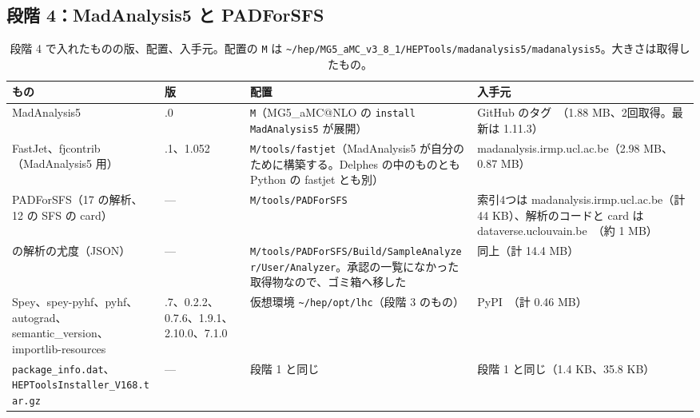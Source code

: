 \documentclass[a4paper,10pt]{ltjsarticle}
\makeatletter
\newcommand{\MGaMC}{MG5\_aMC@NLO}
\newcommand{\pth}[1]{\texttt{\textasciitilde/}\nolinkurl{#1}}
\makeatother
\begin{document}
\subsection{段階 4：MadAnalysis5 と PADForSFS}\label{sec:lhc4}

\begin{table}[htbp]
\centering\small
\caption{段階 4 で入れたものの版、配置、入手元。配置の \texttt{M} は \pth{hep/MG5_aMC_v3_8_1/HEPTools/madanalysis5/madanalysis5}。大きさは取得したもの。}
\label{tab:lhc4}
\begin{tabularx}{\linewidth}{>{\raggedright\arraybackslash}p{3.4cm}>{\raggedright\arraybackslash}p{1.7cm}>{\raggedright\arraybackslash}X>{\raggedright\arraybackslash}p{4.0cm}}
\toprule
\textbf{もの} & \textbf{版} & \textbf{配置} & \textbf{入手元} \\
\midrule
MadAnalysis5 & 1.11.0 & \texttt{M}（\MGaMC{} の \texttt{install MadAnalysis5} が展開） & GitHub のタグ~\cite{ma5,ma5expert,url:ma5}（1.88 MB、2回取得。最新は 1.11.3） \\
FastJet、fjcontrib（MadAnalysis5 用） & 3.4.1、1.052 & \texttt{M/tools/fastjet}（MadAnalysis5 が自分のために構築する。Delphes の中のものとも Python の fastjet とも別） & madanalysis.irmp.ucl.ac.be（2.98 MB、0.87 MB） \\
PADForSFS（17 の解析、12 の SFS の card） & — & \texttt{M/tools/PADForSFS} & 索引4つは madanalysis.irmp.ucl.ac.be（計 44 KB）、解析のコードと card は dataverse.uclouvain.be~\cite{sfs}（約 1 MB） \\
11 の解析の尤度（JSON） & — & \texttt{M/tools/PADForSFS/}\allowbreak\texttt{Build/SampleAnalyzer/}\allowbreak\texttt{User/Analyzer}。承認の一覧になかった取得物なので、ゴミ箱へ移した & 同上（計 14.4 MB） \\
Spey、spey-pyhf、pyhf、autograd、semantic\_version、importlib-resources & 0.2.7、0.2.2、0.7.6、1.9.1、2.10.0、7.1.0 & 仮想環境 \pth{hep/opt/lhc}（段階 3 のもの） & PyPI~\cite{spey,pyhf}（計 0.46 MB） \\
\nolinkurl{package_info.dat}、\nolinkurl{HEPToolsInstaller_V168.tar.gz} & — & 段階 1 と同じ & 段階 1 と同じ（1.4 KB、35.8 KB） \\
\bottomrule
\end{tabularx}
\end{table}
\end{document}
